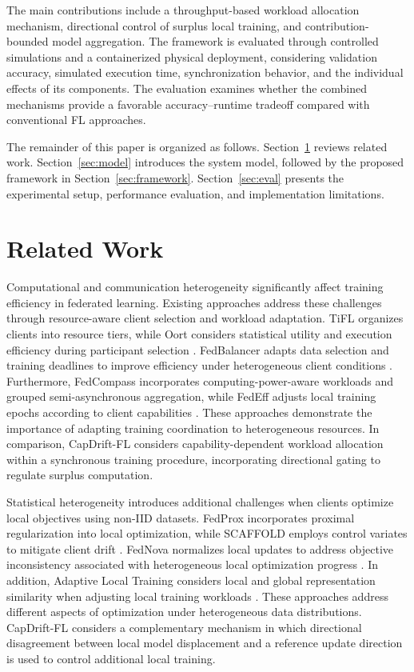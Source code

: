 \documentclass[conference]{IEEEtran}
\begin{document}
The main contributions include a throughput-based workload allocation mechanism, directional control of surplus local training, and contribution-bounded model aggregation. The framework is evaluated through controlled simulations and a containerized physical deployment, considering validation accuracy, simulated execution time, synchronization behavior, and the individual effects of its components. The evaluation examines whether the combined mechanisms provide a favorable accuracy--runtime tradeoff compared with conventional FL approaches.

The remainder of this paper is organized as follows. Section~\ref{sec:related} reviews related work. Section~\ref{sec:model} introduces the system model, followed by the proposed framework in Section~\ref{sec:framework}. Section~\ref{sec:eval} presents the experimental setup, performance evaluation, and implementation limitations.

\section{Related Work}
\label{sec:related}
Computational and communication heterogeneity significantly affect training efficiency in federated learning. Existing approaches address these challenges through resource-aware client selection and workload adaptation. TiFL organizes clients into resource tiers, while Oort considers statistical utility and execution efficiency during participant selection \cite{chai2020tifl,lai2021oort}. FedBalancer adapts data selection and training deadlines to improve efficiency under heterogeneous client conditions \cite{shin2022fedbalancer}. Furthermore, FedCompass incorporates computing-power-aware workloads and grouped semi-asynchronous aggregation, while FedEff adjusts local training epochs according to client capabilities \cite{li2024fedcompass,narmadha2025fedeff}. These approaches demonstrate the importance of adapting training coordination to heterogeneous resources. In comparison, CapDrift-FL considers capability-dependent workload allocation within a synchronous training procedure, incorporating directional gating to regulate surplus computation.

Statistical heterogeneity introduces additional challenges when clients optimize local objectives using non-IID datasets. FedProx incorporates proximal regularization into local optimization, while SCAFFOLD employs control variates to mitigate client drift \cite{li2020fedprox,karimireddy2020scaffold}. FedNova normalizes local updates to address objective inconsistency associated with heterogeneous local optimization progress \cite{wang2020fednova}. In addition, Adaptive Local Training considers local and global representation similarity when adjusting local training workloads \cite{shenaj2025alt}. These approaches address different aspects of optimization under heterogeneous data distributions. CapDrift-FL considers a complementary mechanism in which directional disagreement between local model displacement and a reference update direction is used to control additional local training.
\end{document}
